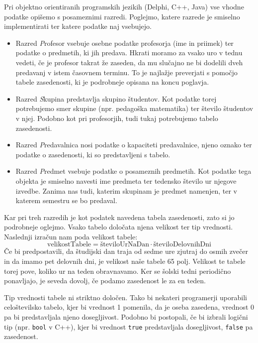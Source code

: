 \documentclass[a4paper,10pt]{article}
\begin{document}
Pri objektno orientiranih programskih jezikih (Delphi, C++, Java) vse vhodne podatke
opišemo s posameznimi razredi. Poglejmo, katere razrede je smiselno implementirati ter
katere podatke naj vsebujejo.
      \texttt{}   
      \begin{itemize}
         \item Razred \emph Profesor vsebuje osebne podatke profesorja (ime in priimek) ter
         podatke o predmetih, ki jih predava. Hkrati moramo za vsako uro v tednu vedeti, če
         je profesor takrat že zaseden, da mu slučajno ne bi dodelili dveh predavanj v istem
         časovnem terminu. To je najlažje preverjati s pomočjo tabele zasedenosti, ki je
         podrobneje opisana na koncu poglavja.
      
         \item Razred \emph Skupina predstavlja skupino študentov. Kot podatke torej potrebujemo
         smer skupine (npr. pedagoška matematika) ter število študentov v njej. Podobno kot pri
         profesorjih, tudi tukaj potrebujemo tabelo zasedenosti.
      
         \item Razred \emph Predavalnica nosi podatke o kapaciteti predavalnice, njeno oznako
         ter podatke o zasedenosti, ki so predstavljeni s tabelo.
      
         \item Razred \emph Predmet vsebuje podatke o posameznih predmetih. Kot podatke tega
         objekta je smiselno navesti ime predmeta ter tedensko število ur njegove izvedbe.
         Zanima nas tudi, katerim skupinam je predmet namenjen, ter v katerem semestru se bo
         predaval.
      \end{itemize}


\noindent
Kar pri treh razredih je kot podatek navedena tabela zasedenosti, zato si jo podrobneje
oglejmo. Vsako tabelo določata njena velikost ter tip vrednosti. Naslednji izračun nam
poda velikost tabele:
\[
\text{velikostTabele} = \text{številoUrNaDan} \cdot \text{številoDelovnihDni}
\]
Če bi predpostavili, da študijski dan traja od sedme ure zjutraj do osmih zvečer in da
imamo pet delovnih dni, je velikost naše tabele 65 polj. Velikost te tabele torej pove,
koliko ur na teden obravnavamo. Ker se šolski tedni periodično ponavljajo, je seveda
dovolj, če podamo zasedenost le za en teden.


Tip vrednosti tabele ni striktno določen. Tako bi nekateri programerji uporabili
celoštevilsko tabelo, kjer bi vrednost 1 pomenila, da je oseba zasedena, vrednost 0
pa bi predstavljala njeno dosegljivost. Podobno bi postopali, če bi izbrali logični
tip (npr. \texttt{bool} v C++), kjer bi vrednost \texttt{true} predstavljala
dosegljivost, \texttt{false} pa zasedenost.
\end{document}

